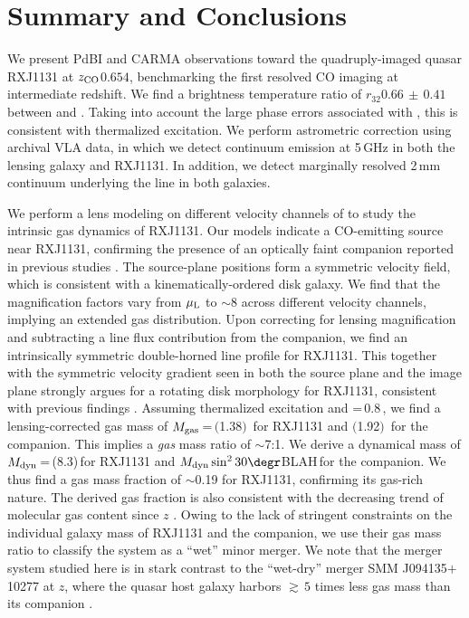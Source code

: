 \documentclass[]{emulateapj}
\begin{document}
\section{Summary and Conclusions} \label{sec:sum}
We present PdBI \bco and CARMA \cco observations toward the
quadruply-imaged quasar RXJ1131 at $z_{\rm CO}$\ssim$0.654$, 
benchmarking the first resolved CO imaging at intermediate redshift.
We find a brightness temperature ratio of $r_{32}$\eq$0.66\,\pm\,0.41$ between \bco and 
\cco. Taking into account the large phase errors associated with \cco, this
is consistent with thermalized excitation.
We perform astrometric correction using archival VLA data, in which we detect continuum emission at 5\,GHz in 
both the lensing galaxy and RXJ1131.
In addition, we detect marginally resolved 2\,mm continuum underlying the \bco line in both galaxies.

We perform a lens modeling on different velocity channels of \bco to study the intrinsic gas dynamics of RXJ1131. 
Our models indicate a CO-emitting source near RXJ1131, confirming 
the presence of an optically faint companion reported in previous studies . 
The source-plane positions form a symmetric velocity field, 
which is consistent with a kinematically-ordered disk galaxy.
We find that the magnification factors vary from $\mu_{\rm L}$ to $\sim8$ across different
velocity channels, implying an extended gas distribution.
Upon correcting for lensing magnification and subtracting a line flux contribution from the companion, 
we find an intrinsically symmetric double-horned line profile for RXJ1131.
This together with the symmetric velocity gradient seen in both the source plane and the image plane 
strongly argues for a rotating disk morphology for RXJ1131, consistent with previous findings .
Assuming thermalized excitation and \alphaco=\,0.8\,\alphaU,
we find a lensing-corrected gas mass of $M_{\rm gas}$\,=\,$($1.38$)$\, \Msun 
for RXJ1131
and $($1.92$)$\, \Msun for the companion.
This implies a {\em gas} mass ratio of $\sim$7:1. 
We derive a dynamical mass of $M_{\rm dyn}$\,=\,(8.3)\,\Msun for RXJ1131 and 
 $M_{\rm dyn} \sin^2 30\degr$\ssim BLAH\,\Msun for the companion. 
We thus find a gas mass fraction of $\sim$0.19 for RXJ1131, confirming its gas-rich nature.
The derived gas fraction is also consistent with the decreasing trend of molecular gas content
since $z$ \citep{Combes13a}.
Owing to the lack of stringent constraints on the individual galaxy mass of RXJ1131 and the companion, we use 
their gas mass ratio to classify the system as a ``wet'' minor merger.
We note that the merger system studied here is in stark contrast to the
``wet-dry'' merger SMM J094135$+$10277 at $z$,  
where the quasar host galaxy harbors $\gtrsim$\,$5$ times less gas mass than its companion \citep{Riechers13a}.
 
\end{document}
